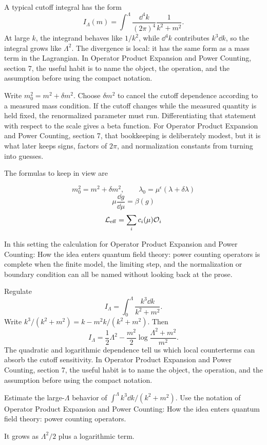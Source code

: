 A typical cutoff integral has the form
\[
  I_\Lambda(m)=\int^{\Lambda}\frac{\dd^4k}{(2\pi)^4}\frac{1}{k^2+m^2}.
\]
At large \(k\), the integrand behaves like \(1/k^2\), while \(\dd^4k\) contributes \(k^3\dd k\), so the integral grows like \(\Lambda^2\).  The divergence is local: it has the same form as a mass term in the Lagrangian.  In Operator Product Expansion and Power Counting, section 7, the useful habit is to name the object, the operation, and the assumption before using the compact notation.

Write \(m_0^2=m^2+\delta m^2\).  Choose \(\delta m^2\) to cancel the cutoff dependence according to a measured mass condition.  If the cutoff changes while the measured quantity is held fixed, the renormalized parameter must run.  Differentiating that statement with respect to the scale gives a beta function.  For Operator Product Expansion and Power Counting, section 7, that bookkeeping is deliberately modest, but it is what later keeps signs, factors of \(2\pi\), and normalization constants from turning into guesses.

The formulas to keep in view are

\[
  m_0^2=m^2+\delta m^2,\qquad \lambda_0=\mu^\epsilon(\lambda+\delta\lambda)
\]
\[
  \mu\frac{\dd g}{\dd\mu}=\beta(g)
\]
\[
  \mathcal L_{\mathrm{eff}}=\sum_i c_i(\mu)\mathcal O_i
\]

In this setting the calculation for Operator Product Expansion and Power Counting: How the idea enters quantum field theory: power counting operators is complete when the finite model, the limiting step, and the normalization or boundary condition can all be named without looking back at the prose.




\begin{example}
Regulate
\[
  I_\Lambda=\int_0^\Lambda\frac{k^3\dd k}{k^2+m^2}.
\]
Write \(k^3/(k^2+m^2)=k-m^2k/(k^2+m^2)\).  Then
\[
  I_\Lambda=\frac12\Lambda^2-\frac{m^2}{2}\log\frac{\Lambda^2+m^2}{m^2}.
\]
The quadratic and logarithmic dependence tell us which local counterterms can absorb the cutoff sensitivity.  In Operator Product Expansion and Power Counting, section 7, the useful habit is to name the object, the operation, and the assumption before using the compact notation.
\end{example}



\begin{exercise}
Estimate the large-\(\Lambda\) behavior of \(\int^\Lambda k^3\dd k/(k^2+m^2)\).  Use the notation of Operator Product Expansion and Power Counting: How the idea enters quantum field theory: power counting operators.
\begin{answer}
It grows as \(\Lambda^2/2\) plus a logarithmic term.
\end{answer}
\end{exercise}

